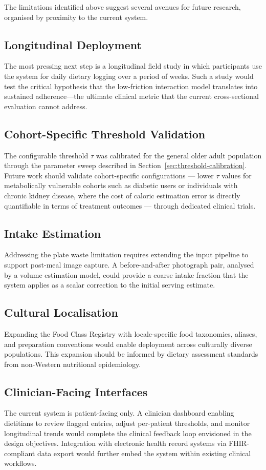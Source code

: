 The limitations identified above suggest several avenues for future research, organised by proximity to the current system.

\subsection{Longitudinal Deployment}
The most pressing next step is a longitudinal field study in which participants use the system for daily dietary logging over a period of weeks. Such a study would test the critical hypothesis that the low-friction interaction model translates into sustained adherence---the ultimate clinical metric that the current cross-sectional evaluation cannot address.

\subsection{Cohort-Specific Threshold Validation}
The configurable threshold $\tau$ was calibrated for the general older adult population through the parameter sweep described in Section~\ref{sec:threshold-calibration}. Future work should validate cohort-specific configurations — lower $\tau$ values for metabolically vulnerable cohorts such as diabetic users or individuals with chronic kidney disease, where the cost of caloric estimation error is directly quantifiable in terms of treatment outcomes — through dedicated clinical trials.

\subsection{Intake Estimation}
Addressing the plate waste limitation requires extending the input pipeline to support post-meal image capture. A before-and-after photograph pair, analysed by a volume estimation model, could provide a coarse intake fraction that the system applies as a scalar correction to the initial serving estimate.

\subsection{Cultural Localisation}
Expanding the Food Class Registry with locale-specific food taxonomies, aliases, and preparation conventions would enable deployment across culturally diverse populations. This expansion should be informed by dietary assessment standards from non-Western nutritional epidemiology.

\subsection{Clinician-Facing Interfaces}
The current system is patient-facing only. A clinician dashboard enabling dietitians to review flagged entries, adjust per-patient thresholds, and monitor longitudinal trends would complete the clinical feedback loop envisioned in the design objectives. Integration with electronic health record systems via FHIR-compliant data export would further embed the system within existing clinical workflows.

